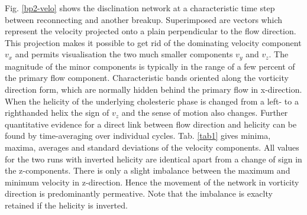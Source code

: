 \documentclass[aps,pre,reprint,superscriptaddress, twocolumn]{revtex4}
\begin{document}
Fig. \ref{bp2-velo} shows the disclination network at a characteristic time step between reconnecting and another breakup.
Superimposed are vectors which represent the velocity projected onto a plain perpendicular to the flow direction.
This projection makes it possible to get rid of the dominating velocity component $v_x$ and permits visualisation the 
two much smaller components $v_y$ and $v_z$.
The magnitude of the minor components is typically in the range of a few percent of the primary flow component.
Characteristic bands oriented along the vorticity direction form, which are normally hidden behind the primary flow in x-direction.
When the helicity of the underlying cholesteric phase is changed from a left- to a righthanded helix the sign of $v_z$ 
and the sense of motion also changes.
Further quantitative evidence for a direct link between flow direction and helicity can be found by time-averaging over
individual cycles.
Tab. \ref{tab1} gives minima, maxima, averages and standard deviations of the velocity components.
All values for the two runs with inverted helicity are identical apart from a change of sign in the z-components.
There is only a slight imbalance between the maximum and minimum velocity in z-direction.
Hence the movement of the network in vorticity direction is predominantly permeative.
Note that the imbalance is exaclty retained if the helicity is inverted.
\end{document}
